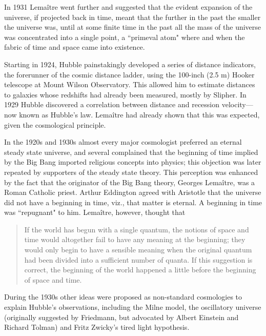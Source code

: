 \documentclass[14pt, oneside]{book}
\begin{document}
			In 1931 Lemaître went further and suggested that the evident expansion of the universe, if projected back in time, meant that the further in the past the smaller the universe was, until at some finite time in the past all the mass of the universe was concentrated into a single point, a ``primeval atom" where and when the fabric of time and space came into existence.
			
			Starting in 1924, Hubble painstakingly developed a series of distance indicators, the forerunner of the cosmic distance ladder, using the 100-inch (2.5 m) Hooker telescope at Mount Wilson Observatory. This allowed him to estimate distances to galaxies whose redshifts had already been measured, mostly by Slipher. In 1929 Hubble discovered a correlation between distance and recession velocity—now known as Hubble's law. Lemaître had already shown that this was expected, given the cosmological principle.
			
			In the 1920s and 1930s almost every major cosmologist preferred an eternal steady state universe, and several complained that the beginning of time implied by the Big Bang imported religious concepts into physics; this objection was later repeated by supporters of the steady state theory. This perception was enhanced by the fact that the originator of the Big Bang theory, Georges Lemaître, was a Roman Catholic priest. Arthur Eddington agreed with Aristotle that the universe did not have a beginning in time, viz., that matter is eternal. A beginning in time was ``repugnant" to him. Lemaître, however, thought that
			
			\blockquote{ If the world has begun with a single quantum, the notions of space and time would altogether fail to have any meaning at the beginning; they would only begin to have a sensible meaning when the original quantum had been divided into a sufficient number of quanta. If this suggestion is correct, the beginning of the world happened a little before the beginning of space and time. }
			
			During the 1930s other ideas were proposed as non-standard cosmologies to explain Hubble's observations, including the Milne model, the oscillatory universe (originally suggested by Friedmann, but advocated by Albert Einstein and Richard Tolman) and Fritz Zwicky's tired light hypothesis.
			
\end{document}
